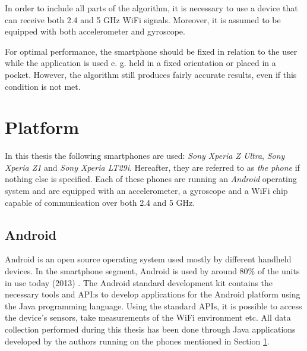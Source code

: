 \documentclass{LTHthesis}
\begin{document}
In order to include all parts of the algorithm, it is necessary to use a device that can receive both 2.4 and 5 GHz WiFi signals. Moreover, it is assumed to be equipped with both accelerometer and gyroscope.

For optimal performance, the smartphone should be fixed in relation to the user while the application is used e. g. held in a fixed orientation or placed in a pocket. However, the algorithm still produces fairly accurate results, even if this condition is not met. 

%
\section{Platform}
\label{sec:platform}
%
In this thesis the following smartphones are used: \emph{Sony Xperia Z Ultra}, \emph{Sony Xperia Z1} and \emph{Sony Xperia LT29i}. Hereafter, they are referred to as \emph{the phone} if nothing else is specified. Each of these phones are running an \emph{Android} operating system and are equipped with an accelerometer, a gyroscope and a WiFi chip capable of communication over both 2.4 and 5 GHz.
%
\subsection{Android} 
%
Android is an open source operating system used mostly by different handheld devices. In the smartphone segment, Android is used by around 80\% of the units in use today (2013) \cite{android}. The Android standard development kit contains the necessary tools and API:s to develop applications for the Android platform using the Java programming language. Using the standard APIs, it is possible to access the device's sensors, take measurements of the WiFi environment etc. All data collection performed during this thesis has been done through Java applications developed by the authors running on the phones mentioned in Section \ref{sec:platform}. 
%
\end{document}
